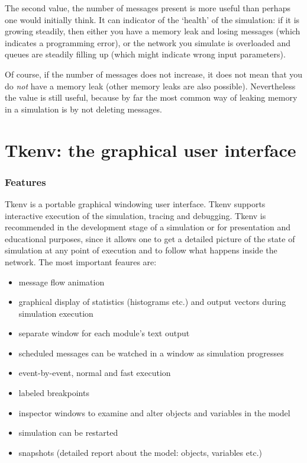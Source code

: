 The second value, the number of messages present is more useful than
perhaps one would initially think. It can indicator of the `health' of the simulation:
if it is growing steadily, then either you have a memory leak and losing
messages (which indicates a programming error), or the network you simulate is
overloaded and queues are steadily filling up (which might indicate wrong input
parameters).

Of course, if the number of messages does not increase, it does not mean
that you do \textit{not} have a memory leak (other memory leaks are also
possible). Nevertheless the value is still useful, because by far the
most common way of leaking memory in a simulation is by not deleting messages.



\section{Tkenv: the graphical user interface}

\subsubsection{Features}

Tkenv is a portable graphical windowing user interface.
Tkenv supports interactive execution of the simulation, tracing and
debugging. Tkenv is recommended in the
development stage of a simulation or for presentation and educational
purposes, since it allows one to get a detailed picture of the state
of simulation at any point of execution and to follow what happens
inside the network. The most important feaures are:
\begin{itemize}
  \item{message flow animation}
  \item{graphical display of statistics (histograms etc.) and output
    vectors during simulation execution}
  \item{separate window for each module's text output}
  \item{scheduled messages can be watched in a window as simulation
    progresses}
  \item{event-by-event, normal and fast execution}
  \item{labeled breakpoints}
  \item{inspector windows to examine and alter objects and variables
    in the model}
  \item{simulation can be restarted}
  \item{snapshots (detailed report about the model: objects, variables
    etc.)}
\end{itemize}


